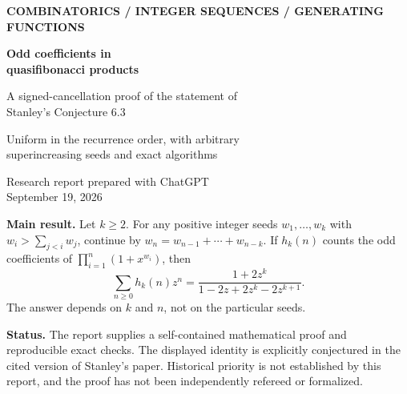 \documentclass[11pt]{article}
\numberwithin{equation}{section}
\theoremstyle{definition}
\theoremstyle{remark}
\begin{document}
\begin{titlepage}
\vspace*{12mm}
{\small\bfseries\color{Accent} COMBINATORICS \quad / \quad INTEGER SEQUENCES \quad / \quad GENERATING FUNCTIONS}\par
\vspace{14mm}
{\Huge\bfseries\color{Ink} Odd coefficients in\\[3pt] quasifibonacci products\par}
\vspace{8mm}
{\Large A signed-cancellation proof of the statement of\\[3pt]
Stanley's Conjecture 6.3\par}
\vspace{9mm}
{\large Uniform in the recurrence order, with arbitrary\\
superincreasing seeds and exact algorithms\par}
\vspace{13mm}
{\normalsize Research report prepared with ChatGPT\\
September 19, 2026\par}
\vspace{12mm}
\noindent\colorbox{Pale}{\parbox{\dimexpr\textwidth-2\fboxsep\relax}{
\vspace{5pt}\textbf{Main result.} Let $k\ge2$. For any positive integer seeds
$w_1,\ldots,w_k$ with $w_i>\sum_{j<i}w_j$, continue by
$w_n=w_{n-1}+\cdots+w_{n-k}$. If $h_k(n)$ counts the odd coefficients of
$\prod_{i=1}^n(1+x^{w_i})$, then
\[
\boxed{\displaystyle \sum_{n\ge0}h_k(n)z^n
 =\frac{1+2z^k}{1-2z+2z^k-2z^{k+1}}.}
\]
The answer depends on $k$ and $n$, not on the particular seeds.
\vspace{5pt}}}
\vfill
\noindent\textbf{Status.} The report supplies a self-contained mathematical proof and
reproducible exact checks. The displayed identity is explicitly conjectured in the
cited version of Stanley's paper. Historical priority is not established by this
report, and the proof has not been independently refereed or formalized.
\end{titlepage}

\begin{abstract}
We study the parity of coefficients of finite products whose exponents satisfy a
$k$-term Fibonacci recurrence. The target is the rational generating function
stated in Stanley's Conjecture~6.3. We prove that identity for every $k\ge2$ and,
more generally, for every quasifibonacci sequence with superincreasing initial
seeds. The key construction changes selected plus signs in the product to minus
signs: a periodic sign block of length $k+1$ with product $-1$ makes every
coefficient belong to $\{-1,0,1\}$. Since signs disappear modulo two, a parity
count becomes a squared-coefficient norm. An exact overlap identity then gives
a recurrence of order $k+1$. We also obtain a positive recurrence, a colored
composition interpretation, minimality of the recurrence order, exponential
asymptotics, and a coefficient-parity algorithm requiring only a single branch
at each step. All principal identities are proved independently of the
computational checks included in the archive.
\end{abstract}
\tableofcontents
\newpage
\end{document}
